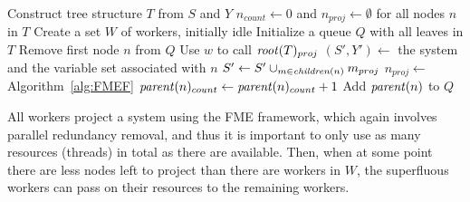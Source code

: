 \begin{algorithmic}
	\State Construct  tree structure $T$ from $S$ and $Y$
	\State $n_{count}\gets 0$ and $n_{proj}\gets\emptyset$ for all nodes $n$ in $T$
	\State Create a set $W$ of workers, initially idle
	\State Initialize a queue $Q$ with all leaves in $T$
			\State Remove first node $n$ from $Q$
			\State Use $w$ to call 
		\EndIf
	\EndWhile
	\State \Return $\mathit{root}(T)_{proj}$
\EndFunction
\Statex
{}
	\State $(S',Y')\gets$ the system and the variable set associated with $n$
	\State $S'\gets S'\cup_{m\in \mathit{children}(n)} m_{proj}$ 
	\State $n_{proj}\gets$  \Comment Algorithm~\ref{alg:FMEF}
	\State $\mathit{parent}(n)_{count} \gets \mathit{parent}(n)_{count} +1$
		\State Add $\mathit{parent}(n)$ to $Q$
	\EndIf
	\State \Return
\EndFunction
\end{algorithmic}	

\vspace{1mm}
All workers project a system using the FME framework, which again involves parallel redundancy removal, and thus it is important to only use as many resources (threads) in total as there are available.
Then, when at some point there are less nodes left to project than there are workers in $W$, the superfluous workers can pass on their resources to the remaining workers.  
%